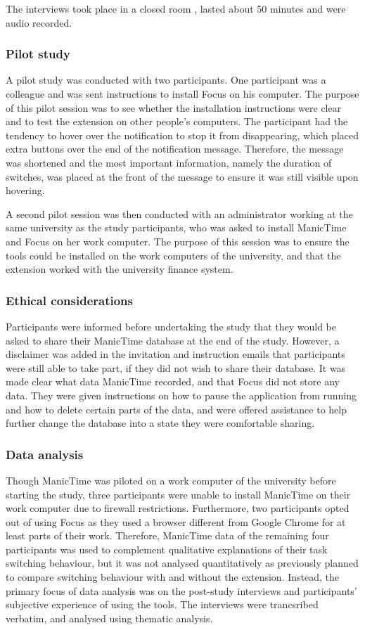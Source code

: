 The interviews took place in a closed room , lasted about 50 minutes and were audio recorded.

\subsubsection{Pilot study}
A pilot study was conducted with two participants. One participant was a colleague and was sent instructions to install Focus on his computer. The purpose of this pilot session was to see whether the installation instructions were clear and to test the extension on other people's computers. The participant had the tendency to hover over the notification to stop it from disappearing, which placed extra buttons over the end of the notification message. Therefore, the message was shortened and the most important information, namely the duration of switches, was placed at the front of the message to ensure it was still visible upon hovering.

A second pilot session was then conducted with an administrator working at the same university as the study participants, who was asked to install ManicTime and Focus on her work computer. The purpose of this session was to ensure the tools could be installed on the work computers of the university, and that the extension worked with the university finance system.


\subsubsection{Ethical considerations}
Participants were informed before undertaking the study that they would be asked to share their ManicTime database at the end of the study. However, a disclaimer was added in the invitation and instruction emails that participants were still able to take part, if they did not wish to share their database. It was made clear what data ManicTime recorded, and that Focus did not store any data. They were given instructions on how to pause the application from running and how to delete certain parts of the data, and were offered assistance to help further change the database into a state they were comfortable sharing. 

\subsubsection{Data analysis}
Though ManicTime was piloted on a work computer of the university before starting the study, three participants were unable to install ManicTime on their work computer due to firewall restrictions. Furthermore, two participants opted out of using Focus as they used a browser different from Google Chrome for at least parts of their work. Therefore, ManicTime data of the remaining four participants was used to complement qualitative explanations of their task switching behaviour, but it was not analysed quantitatively as previously planned to compare switching behaviour with and without the extension. Instead, the primary focus of data analysis was on the post-study interviews and participants' subjective experience of using the tools. The interviews were trancsribed verbatim, and analysed using thematic analysis.

